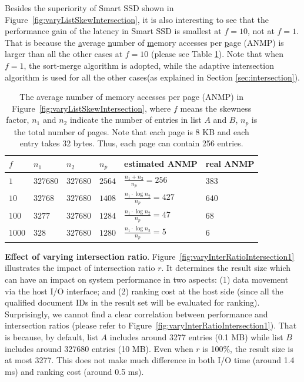 Besides the superiority of Smart SSD shown in Figure~\ref{fig:varyListSkewIntersection}, it is also interesting to see that the performance gain of the latency in Smart SSD is smallest at $f=10$, not at $f=1$. That is because the \underline{a}verage \underline{n}umber of \underline{m}emory accesses per \underline{p}age (ANMP) is larger than all the other cases at $f=10$ (please see Table \ref{tab:varyListSkewIntersection}). Note that when $f=1$, the sort-merge algorithm is adopted, while the adaptive intersection algorithm is used for all the other cases(as explained in Section \ref{sec:intersection}).

\begin{table}[tbp]\small
\centering
\begin{tabular}{l|l|l|l|l|l}\hline\hline
$f$ & $n_1$ & $n_2$ & $n_p$ & estimated ANMP & real ANMP \\\hline
$1$ & $327680$ & $327680$ & $2564$ & $\frac{n_1+n_2}{n_p}=256$ & $383$ \\\hline
$10$ & $32768$ & $327680$ & $1408$ & $\frac{n_1\cdot\log n_2}{n_p}=427$ & $640$ \\\hline
$100$ & $3277$ & $327680$ & $1284$ & $\frac{n_1\cdot\log n_2}{n_p}=47$ & $68$ \\\hline
$1000$ & $328$ & $327680$ & $1280$ & $\frac{n_1\cdot\log n_2}{n_p}=5$ & $6$ \\\hline\hline
\end{tabular}
\caption{The average number of memory accesses per page (ANMP) in Figure~\ref{fig:varyListSkewIntersection}, where $f$ means the skewness factor, $n_1$ and $n_2$ indicate the number of entries in list $A$ and $B$, $n_p$ is the total number of pages. Note that each page is 8 KB and each entry takes 32 bytes. Thus, each page can contain 256 entries.}\label{tab:varyListSkewIntersection}
\end{table}


\textbf{Effect of varying intersection ratio}.
Figure~\ref{fig:varyInterRatioIntersection1} illustrates the impact of intersection ratio $r$.
It determines the result size which can have an impact on system performance in two aspects: (1) data movement via the host I/O interface; and (2) ranking cost at the host side (since all the qualified document IDs in the result set will be evaluated for ranking). Surprisingly, we cannot find a clear correlation between performance and intersection ratios (please refer to Figure~\ref{fig:varyInterRatioIntersection1}).
That is because, by default, list $A$ includes around 3277 entries (0.1 MB) while list $B$ includes around 327680 entries (10 MB). Even when $r$ is 100\%, the result size is at most 3277. This does not make much difference in both I/O time (around 1.4 ms) and ranking cost (around 0.5 ms).

